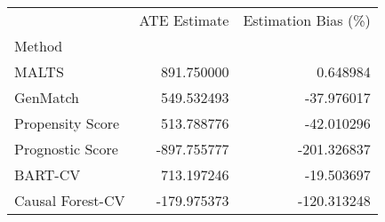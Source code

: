 \begin{tabular}{lrr}
\toprule
{} &  ATE Estimate &  Estimation Bias (\%) \\
Method           &               &                      \\
\midrule
MALTS            &    891.750000 &             0.648984 \\
GenMatch         &    549.532493 &           -37.976017 \\
Propensity Score &    513.788776 &           -42.010296 \\
Prognostic Score &   -897.755777 &          -201.326837 \\
BART-CV          &    713.197246 &           -19.503697 \\
Causal Forest-CV &   -179.975373 &          -120.313248 \\
\bottomrule
\end{tabular}
